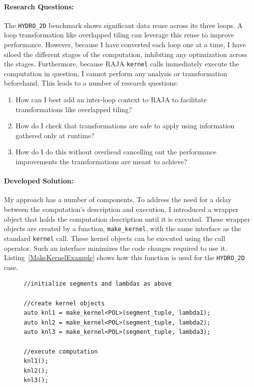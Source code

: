 \documentclass{article}
\begin{document}
\paragraph{Research Questions:}
The \verb.HYDRO_2D. benchmark shows significant data reuse across its three loops.
A loop transformation like overlapped tiling can leverage this reuse to improve performance.
However, because I have converted each loop one at a time, I have siloed the different stages of the computation, inhibiting any optimization across the stages.
Furthermore, because RAJA \verb.kernel. calls immediately execute the computation in question, I cannot perform any analysis or transformation beforehand.
This leads to a number of research questions:
\begin{enumerate}[label=Q1.\arabic*]
\item How can I best add an inter-loop context to RAJA to facilitate transformations like overlapped tiling?\label{q:context}
\item How do I check that transformations are safe to apply using information gathered only at runtime? \label{q:safety}
\item How do I do this without overhead cancelling out the performance improvements the transformations are meant to achieve? \label{q:overhead1}
\end{enumerate}

\paragraph{Developed Solution:}

My approach has a number of components.
To address the need for a delay between the computation's description and execution, I introduced a wrapper object that holds the computation description until it is executed.
These wrapper objects are created by a function, \verb.make_kernel., with the same interface as the standard \verb.kernel. call. 
These kernel objects can be executed using the call operator.
Such an interface minimizes the code changes required to use it.
Listing~\ref{MakeKernelExample} shows how this function is used for the \verb.HYDRO_2D. case.

\begin{figure}
    \begin{lstlisting}[caption={Example usage of the \texttt{make\_kernel} function.},label={MakeKernelExample}]
//initialize segments and lambdas as above

//create kernel objects
auto knl1 = make_kernel<POL>(segment_tuple, lambda1);
auto knl2 = make_kernel<POL>(segment_tuple, lambda2);
auto knl3 = make_kernel<POL>(segment_tuple, lambda3);

//execute computation
knl1();
knl2();
knl3();
    \end{lstlisting}
\end{figure}
\end{document}

